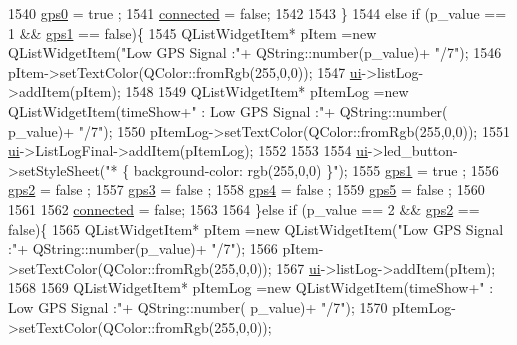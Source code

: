 \begin{DoxyCode}
{1540         \hyperlink{a00008_ae4bd1023a83b82ebd7a9d6687813ffce}{gps0} = true ;
1541         \hyperlink{a00008_ab36823025f12a809217f7771125658c2}{connected} = \textcolor{keyword}{false};
1542 
1543     \}
1544     \textcolor{keywordflow}{else} \textcolor{keywordflow}{if} (p\_value == 1 && \hyperlink{a00008_a937eca780523827d07c23d8199f5034c}{gps1} == \textcolor{keyword}{false})\{
1545         QListWidgetItem* pItem =\textcolor{keyword}{new} QListWidgetItem(\textcolor{stringliteral}{"Low GPS Signal :"}+ QString::number(p\_value)+ \textcolor{stringliteral}{"/7"});
1546         pItem->setTextColor(QColor::fromRgb(255,0,0));
1547         \hyperlink{a00008_a6dc041ef6a2ffb329928d2913e8344e6}{ui}->listLog->addItem(pItem);
1548 
1549         QListWidgetItem* pItemLog =\textcolor{keyword}{new} QListWidgetItem(timeShow+\textcolor{stringliteral}{" : Low GPS Signal :"}+ QString::number(
      p\_value)+ \textcolor{stringliteral}{"/7"});
1550         pItemLog->setTextColor(QColor::fromRgb(255,0,0));
1551         \hyperlink{a00008_a6dc041ef6a2ffb329928d2913e8344e6}{ui}->ListLogFinal->addItem(pItemLog);
1552 
1553 
1554         \hyperlink{a00008_a6dc041ef6a2ffb329928d2913e8344e6}{ui}->led\_button->setStyleSheet(\textcolor{stringliteral}{"* \{ background-color: rgb(255,0,0) \}"});
1555         \hyperlink{a00008_a937eca780523827d07c23d8199f5034c}{gps1} = true ;
1556         \hyperlink{a00008_a5999aa93a3f88a1982f3a87c59f1fd98}{gps2} = false ;
1557         \hyperlink{a00008_a8bc76fea83b1435f743bc2aeb7f6dc4f}{gps3} = false ;
1558         \hyperlink{a00008_ac887c9acf42ed7f7c3688152440af6c7}{gps4} = false ;
1559         \hyperlink{a00008_a130b1f6fe6bc3f128b648457df10b010}{gps5} = false ;
1560 
1561 
1562         \hyperlink{a00008_ab36823025f12a809217f7771125658c2}{connected} = \textcolor{keyword}{false};
1563 
1564     \}\textcolor{keywordflow}{else} \textcolor{keywordflow}{if} (p\_value == 2 && \hyperlink{a00008_a5999aa93a3f88a1982f3a87c59f1fd98}{gps2} == \textcolor{keyword}{false})\{
1565         QListWidgetItem* pItem =\textcolor{keyword}{new} QListWidgetItem(\textcolor{stringliteral}{"Low GPS Signal :"}+ QString::number(p\_value)+ \textcolor{stringliteral}{"/7"});
1566         pItem->setTextColor(QColor::fromRgb(255,0,0));
1567         \hyperlink{a00008_a6dc041ef6a2ffb329928d2913e8344e6}{ui}->listLog->addItem(pItem);
1568 
1569         QListWidgetItem* pItemLog =\textcolor{keyword}{new} QListWidgetItem(timeShow+\textcolor{stringliteral}{" : Low GPS Signal :"}+ QString::number(
      p\_value)+ \textcolor{stringliteral}{"/7"});
1570         pItemLog->setTextColor(QColor::fromRgb(255,0,0));
}
\end{DoxyCode}
